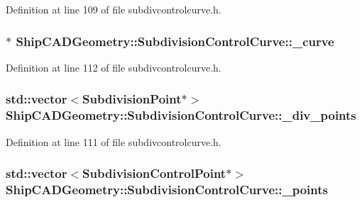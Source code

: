 Definition at line 109 of file subdivcontrolcurve.\-h.

\hypertarget{classShipCADGeometry_1_1SubdivisionControlCurve_a7dd9c824ab09ab75fa472bc0ffc83cb6}{
\subsubsection[{\-\_\-curve}]{$\ast$ Ship\-C\-A\-D\-Geometry\-::\-Subdivision\-Control\-Curve\-::\-\_\-curve\hspace{0.3cm}{\ttfamily [protected]}}}\label{classShipCADGeometry_1_1SubdivisionControlCurve_a7dd9c824ab09ab75fa472bc0ffc83cb6}


Definition at line 112 of file subdivcontrolcurve.\-h.

\hypertarget{classShipCADGeometry_1_1SubdivisionControlCurve_ae8df6891a3f435811616a162ec3b9a4d}{
\subsubsection[{\-\_\-div\-\_\-points}]{\setlength{\rightskip}{0pt plus 5cm}std\-::vector$<${\bf Subdivision\-Point}$\ast$$>$ Ship\-C\-A\-D\-Geometry\-::\-Subdivision\-Control\-Curve\-::\-\_\-div\-\_\-points\hspace{0.3cm}{\ttfamily [protected]}}}\label{classShipCADGeometry_1_1SubdivisionControlCurve_ae8df6891a3f435811616a162ec3b9a4d}


Definition at line 111 of file subdivcontrolcurve.\-h.

\hypertarget{classShipCADGeometry_1_1SubdivisionControlCurve_aee920e208e7da3314721be340b95d504}{
\subsubsection[{\-\_\-points}]{\setlength{\rightskip}{0pt plus 5cm}std\-::vector$<${\bf Subdivision\-Control\-Point}$\ast$$>$ Ship\-C\-A\-D\-Geometry\-::\-Subdivision\-Control\-Curve\-::\-\_\-points\hspace{0.3cm}{\ttfamily [protected]}}}\label{classShipCADGeometry_1_1SubdivisionControlCurve_aee920e208e7da3314721be340b95d504}


